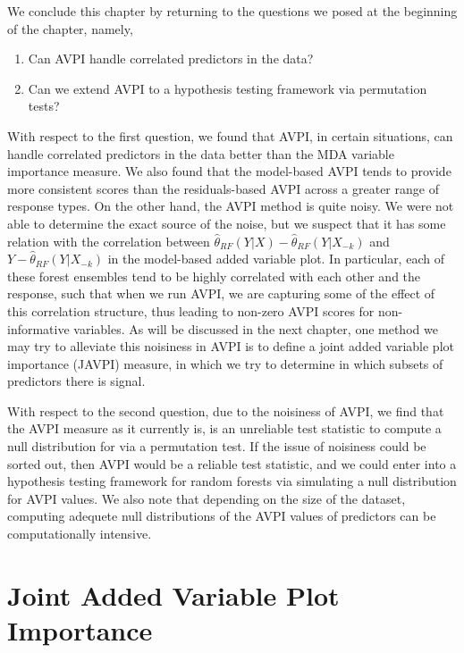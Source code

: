 \documentclass[12pt,twoside]{reedthesis}
\theoremstyle{definition}
\theoremstyle{definition}
\theoremstyle{definition}
\theoremstyle{remark}
\begin{document}
We conclude this chapter by returning to the questions we posed at the
beginning of the chapter, namely,
\begin{enumerate}
  \item Can AVPI handle correlated predictors in the data? 
  \item Can we extend AVPI to a hypothesis testing framework via permutation tests?
\end{enumerate}
With respect to the first question, we found that AVPI, in certain
situations, can handle correlated predictors in the data better than the
MDA variable importance measure. We also found that the model-based AVPI
tends to provide more consistent scores than the residuals-based AVPI
across a greater range of response types. On the other hand, the AVPI
method is quite noisy. We were not able to determine the exact source of
the noise, but we suspect that it has some relation with the correlation
between \(\hat{\theta}_{RF}(Y|X)-\hat{\theta}_{RF}(Y|X_{-k})\) and
\(Y-\hat{\theta}_{RF}(Y|X_{-k})\) in the model-based added variable
plot. In particular, each of these forest ensembles tend to be highly
correlated with each other and the response, such that when we run AVPI,
we are capturing some of the effect of this correlation structure, thus
leading to non-zero AVPI scores for non-informative variables. As will
be discussed in the next chapter, one method we may try to alleviate
this noisiness in AVPI is to define a joint added variable plot
importance (JAVPI) measure, in which we try to determine in which
subsets of predictors there is signal. \par 

With respect to the second question, due to the noisiness of AVPI, we
find that the AVPI measure as it currently is, is an unreliable test
statistic to compute a null distribution for via a permutation test. If
the issue of noisiness could be sorted out, then AVPI would be a
reliable test statistic, and we could enter into a hypothesis testing
framework for random forests via simulating a null distribution for AVPI
values. We also note that depending on the size of the dataset,
computing adequete null distributions of the AVPI values of predictors
can be computationally intensive. \par

\chapter{Joint Added Variable Plot
Importance}\label{joint-added-variable-plot-importance}
\end{document}
